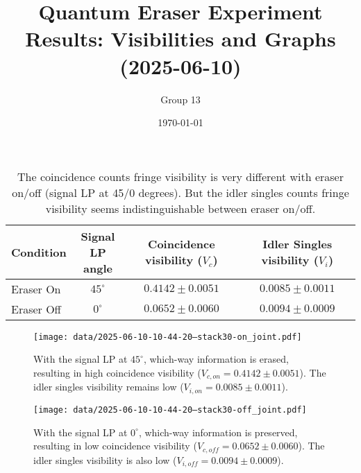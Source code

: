 \documentclass{article}
\title{Quantum Eraser Experiment Results: Visibilities and Graphs (2025-06-10)}
\author{Group 13} %
\date{\today}
\begin{document}
\pagestyle{empty} %

\begin{table}[h!]
\centering
\begin{tabular}{lccc}
\toprule
Condition & \makecell{Signal \\ LP angle} & \makecell{Coincidence \\ visibility ($V_c$)} & \makecell{Idler Singles \\ visibility ($V_i$)} \\
\midrule
Eraser On   & $45^\circ$ & $0.4142 \pm 0.0051$ & $0.0085 \pm 0.0011$ \\
Eraser Off  & $0^\circ$  & $0.0652 \pm 0.0060$ & $0.0094 \pm 0.0009$ \\
\bottomrule
\end{tabular}
\caption*{
  The coincidence counts fringe visibility is very different with eraser on/off (signal LP at 45/0 degrees).
  But the idler singles counts fringe visibility seems indistinguishable between eraser on/off.
}
\end{table}

\begin{figure}[h!]
\centering
\texttt{[image: data/2025-06-10-10-44-20--stack30-on\_joint.pdf]}
\caption*{
  With the signal LP at $45^\circ$, which-way information is erased, resulting in high coincidence visibility ($V_{c,on}=0.4142 \pm 0.0051$). The idler singles visibility remains low ($V_{i,on}=0.0085 \pm 0.0011$).
}
\end{figure}

\begin{figure}[h!]
\centering
\texttt{[image: data/2025-06-10-10-44-20--stack30-off\_joint.pdf]}
\caption*{
  With the signal LP at $0^\circ$, which-way information is preserved, resulting in low coincidence visibility ($V_{c,off}=0.0652 \pm 0.0060$). The idler singles visibility is also low ($V_{i,off}=0.0094 \pm 0.0009$).
}
\end{figure}
\end{document}
